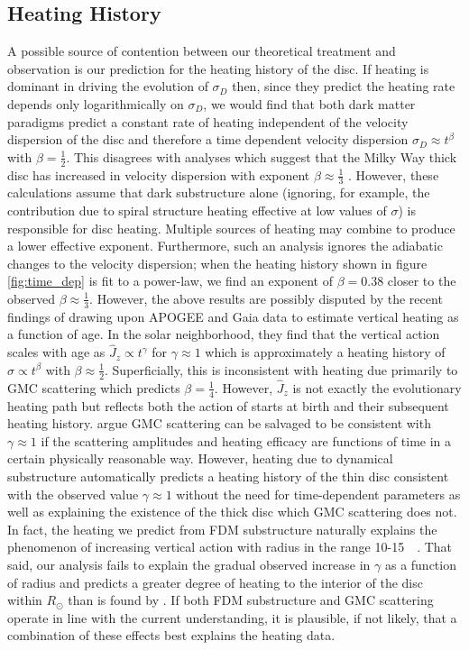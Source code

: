 \documentclass[usenatbib]{mnras}
\begin{document}
\subsection{Heating History}
{\color{red}
A possible source of contention between our theoretical treatment and observation is our prediction for the heating history of the disc. If heating is dominant in driving the evolution of $\sigma_D$ then, since they predict the heating rate depends only logarithmically on $\sigma_D$, we would find that both dark matter paradigms predict a constant rate of heating independent of the velocity dispersion of the disc and therefore a time dependent velocity dispersion $\sigma_D \approx t^{\beta}$ with $\beta = \tfrac{1}{2}$. This disagrees with analyses which suggest that the Milky Way thick disc has increased in velocity dispersion with exponent $\beta \approx \tfrac{1}{3}$ \citep{heating_history}. However, these calculations assume that dark substructure alone (ignoring, for example, the contribution due to spiral structure heating effective at low values of $\sigma$) is responsible for disc heating. Multiple sources of heating may combine to produce a lower effective exponent. Furthermore, such an analysis ignores the adiabatic changes to the velocity dispersion; when the heating history shown in figure \ref{fig:time_dep} is fit to a power-law, we find an exponent of $\beta = 0.38$ closer to the observed $\beta \approx \frac{1}{3}$. However, the above results are possibly disputed by the recent findings of \cite{Gaia_vertical_motions} drawing upon APOGEE and Gaia data to estimate vertical heating as a function of age. In the solar neighborhood, they find that the vertical action scales with age as $\widehat{J}_z \propto t^{\gamma}$ for $\gamma \approx 1$ which is approximately a heating history of $\sigma \propto t^\beta$ with $\beta \approx \frac{1}{2}$. Superficially, this is inconsistent with heating due primarily to GMC scattering which predicts $\beta = \frac{1}{4}$. However, $\widehat{J}_z$ is not exactly the evolutionary heating path but reflects both the action of starts at birth and their subsequent heating history. \cite{Gaia_vertical_motions} argue GMC scattering can be salvaged to be consistent with $\gamma \approx 1$ if the scattering amplitudes and heating efficacy are functions of time in a certain physically reasonable way. However, heating due to dynamical substructure automatically predicts a heating history of the thin disc consistent with the observed value $\gamma \approx 1$ without the need for time-dependent parameters as well as explaining the existence of the thick disc which GMC scattering does not. In fact, the heating we predict from FDM substructure naturally explains the phenomenon of increasing vertical action with radius in the range 10-\SI{15}{\kilo \parsec}. 
That said, our analysis fails to explain the gradual observed increase in $\gamma$ as a function of radius and predicts a greater degree of heating to the interior of the disc within $R_{\odot}$ than is found by \cite{Gaia_vertical_motions}. If both FDM substructure and GMC scattering operate in line with the current understanding, it is plausible, if not likely, that a combination of these effects best explains the heating data. }
\end{document}
